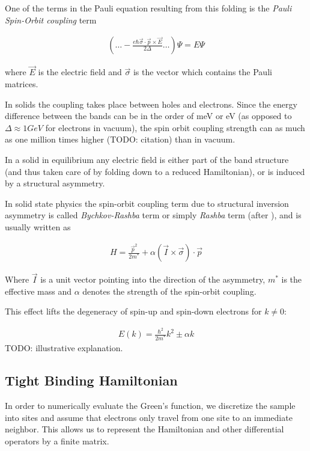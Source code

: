 \documentclass[11pt,twoside]{book}
\newcommand{\inp}[1]{\ensuremath{\left(#1\right)}}
\begin{document}
One of the terms in the Pauli equation resulting from this folding is the
\emph{Pauli Spin-Orbit coupling} term\cite{winkler2003}

\begin{align}
    \left( \ldots - \frac{e\hbar \vec\sigma \cdot \vec p \times \vec E}
                    {2\Delta} \ldots\right)\Psi = E \Psi
\end{align}

where $\vec E$ is the electric field and $\vec \sigma$ is the vector
which contains the Pauli matrices.

In solids the coupling takes place between holes and electrons. Since the
energy difference between the bands can be in the order of meV or eV
(as opposed to $\Delta \approx 1GeV$ for electrons in vacuum), the spin orbit
coupling strength can as much as one million times higher (TODO: citation)
than in vacuum.

In a solid in equilibrium any electric field is either part of the band
structure (and thus taken care of by folding down to a reduced Hamiltonian),
or is induced by a structural asymmetry.

In solid state physics the spin-orbit coupling term due to structural
inversion asymmetry is called \emph{Bychkov-Rashba} term or simply
\emph{Rashba} term (after \cite{rashba}), and is usually written as

\begin{align}
    H = \frac{\vec p ^2}{2m^*} + \alpha \inp{\vec I \times  \vec \sigma} \cdot \vec p
\end{align}

Where $\vec I$ is a unit vector pointing into the direction of the asymmetry,
$m^*$ is the effective mass
and $\alpha$ denotes the strength of the spin-orbit coupling.

This effect lifts the degeneracy of spin-up and spin-down electrons for
$k \not= 0$:

\begin{align}
    E(k) = \frac{\hbar^2}{2 m^*} k^2 \pm \alpha k
\end{align}
TODO: illustrative explanation.


\subsection*{Tight Binding Hamiltonian}
\label{sec:tight-binding}


In order to numerically evaluate the Green's function, we
discretize the sample into sites and assume that electrons only travel from
one site to an immediate neighbor. This allows us to represent the
Hamiltonian and other differential operators by a finite matrix.
\end{document}
